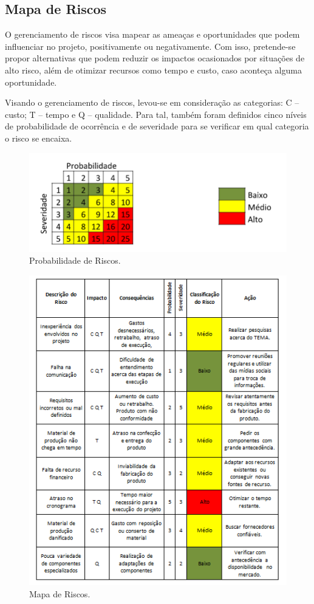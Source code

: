 \subsection{Mapa de Riscos}

O gerenciamento de riscos visa mapear as ameaças e oportunidades que podem influenciar no projeto, positivamente ou negativamente. Com isso, pretende-se propor alternativas que podem reduzir os impactos ocasionados por situações de alto risco, além de otimizar recursos como tempo e custo, caso aconteça alguma oportunidade.

Visando o gerenciamento de riscos, levou-se em consideração as categorias: C – custo; T – tempo e Q – qualidade. Para tal, também foram definidos cinco níveis de probabilidade de ocorrência e de severidade para se verificar em qual categoria o risco se encaixa.

\begin{figure}[!h]
	\centering
	\label{risco1}
	\includegraphics[keepaspectratio=true,scale=0.8]{figuras/risco1.PNG}
	\caption{Probabilidade de Riscos.}
\end{figure}

\begin{figure}[!h]
	\centering
	\label{risco2}
	\includegraphics[keepaspectratio=true,scale=0.8]{figuras/risco2.PNG}
	\caption{Mapa de Riscos.}
\end{figure} 

